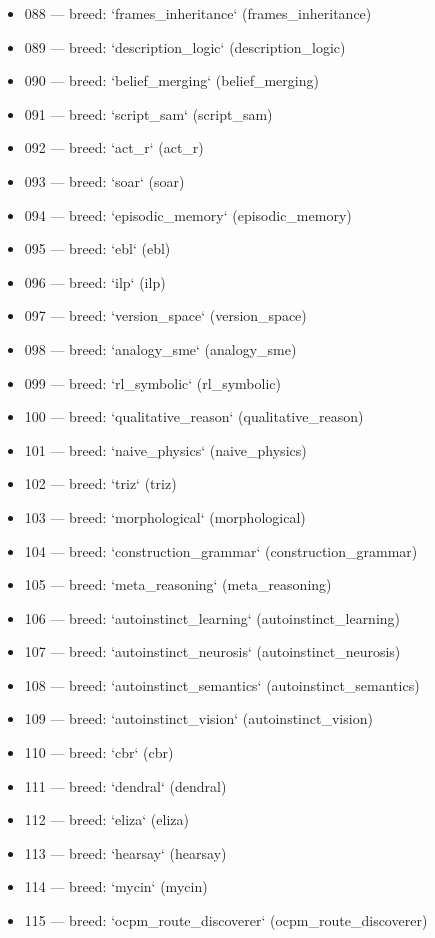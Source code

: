 \begin{itemize}
  \item 088 — breed: `frames\_inheritance` (frames\_inheritance)
  \item 089 — breed: `description\_logic` (description\_logic)
  \item 090 — breed: `belief\_merging` (belief\_merging)
  \item 091 — breed: `script\_sam` (script\_sam)
  \item 092 — breed: `act\_r` (act\_r)
  \item 093 — breed: `soar` (soar)
  \item 094 — breed: `episodic\_memory` (episodic\_memory)
  \item 095 — breed: `ebl` (ebl)
  \item 096 — breed: `ilp` (ilp)
  \item 097 — breed: `version\_space` (version\_space)
  \item 098 — breed: `analogy\_sme` (analogy\_sme)
  \item 099 — breed: `rl\_symbolic` (rl\_symbolic)
  \item 100 — breed: `qualitative\_reason` (qualitative\_reason)
  \item 101 — breed: `naive\_physics` (naive\_physics)
  \item 102 — breed: `triz` (triz)
  \item 103 — breed: `morphological` (morphological)
  \item 104 — breed: `construction\_grammar` (construction\_grammar)
  \item 105 — breed: `meta\_reasoning` (meta\_reasoning)
  \item 106 — breed: `autoinstinct\_learning` (autoinstinct\_learning)
  \item 107 — breed: `autoinstinct\_neurosis` (autoinstinct\_neurosis)
  \item 108 — breed: `autoinstinct\_semantics` (autoinstinct\_semantics)
  \item 109 — breed: `autoinstinct\_vision` (autoinstinct\_vision)
  \item 110 — breed: `cbr` (cbr)
  \item 111 — breed: `dendral` (dendral)
  \item 112 — breed: `eliza` (eliza)
  \item 113 — breed: `hearsay` (hearsay)
  \item 114 — breed: `mycin` (mycin)
  \item 115 — breed: `ocpm\_route\_discoverer` (ocpm\_route\_discoverer)
\end{itemize}
